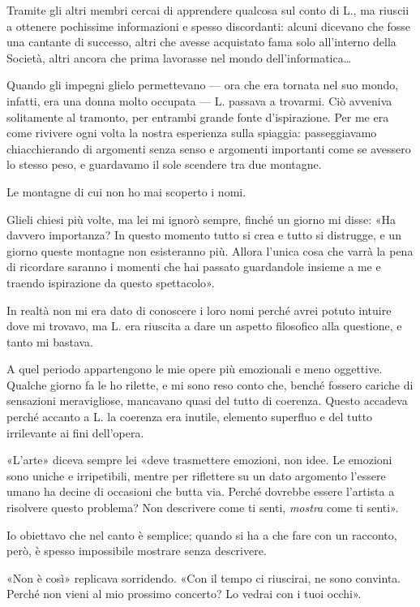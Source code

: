 \documentclass[a4paper,10pt]{memoir}
\begin{document}
Tramite gli altri membri cercai di apprendere qualcosa sul conto di L., ma riuscii a ottenere pochissime informazioni e
spesso discordanti: alcuni dicevano che fosse una cantante di successo, altri che avesse acquistato fama solo
all'interno della Società, altri ancora che prima lavorasse nel mondo dell'informatica\dots{}

Quando gli impegni glielo permettevano --- ora che era tornata nel suo mondo, infatti, era una donna molto occupata ---
L. passava a trovarmi. Ciò avveniva solitamente al tramonto, per entrambi grande fonte d'ispirazione. Per me era come
rivivere ogni volta la nostra esperienza sulla spiaggia: passeggiavamo chiacchierando di argomenti senza senso e
argomenti importanti come se avessero lo stesso peso, e guardavamo il sole scendere tra due montagne.

Le montagne di cui non ho mai scoperto i nomi.

Glieli chiesi più volte, ma lei mi ignorò sempre, finché un giorno mi disse: «Ha davvero importanza? In questo momento
tutto si crea e tutto si distrugge, e un giorno queste montagne non esisteranno più. Allora l'unica cosa che varrà la
pena di ricordare saranno i momenti che hai passato guardandole insieme a me e traendo ispirazione da questo
spettacolo».

In realtà non mi era dato di conoscere i loro nomi perché avrei potuto intuire dove mi trovavo, ma L. era riuscita a
dare un aspetto filosofico alla questione, e tanto mi bastava.

A quel periodo appartengono le mie opere più emozionali e meno oggettive. Qualche giorno fa le ho rilette, e mi sono
reso conto che, benché fossero cariche di sensazioni meravigliose, mancavano quasi del tutto di coerenza. Questo
accadeva perché accanto a L. la coerenza era inutile, elemento superfluo e del tutto irrilevante ai fini dell'opera.

«L'arte» diceva sempre lei «deve trasmettere emozioni, non idee. Le emozioni sono uniche e irripetibili, mentre per
riflettere su un dato argomento l'essere umano ha decine di occasioni che butta via. Perché dovrebbe essere l'artista a
risolvere questo problema? Non descrivere come ti senti, \emph{mostra} come ti senti».

Io obiettavo che nel canto è semplice; quando si ha a che fare con un racconto, però, è spesso impossibile mostrare
senza descrivere.

«Non è così» replicava sorridendo. «Con il tempo ci riuscirai, ne sono convinta. Perché non vieni al mio prossimo
concerto? Lo vedrai con i tuoi occhi».
\end{document}
